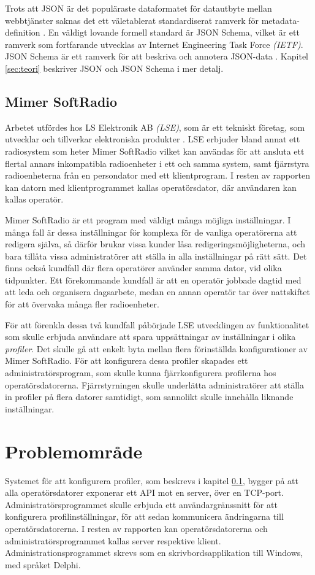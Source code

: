 Trots att JSON är det populäraste dataformatet för datautbyte mellan webbtjänster saknas det ett väletablerat standardiserat ramverk för metadata-definition \cite{Pezoa2016}. En väldigt lovande formell standard är JSON Schema, vilket är ett ramverk som fortfarande utvecklas av Internet Engineering Task Force \textit{(IETF)}. JSON Schema är ett ramverk för att beskriva och annotera JSON-data \cite{A.Wright}. Kapitel \ref{sec:teori} beskriver JSON och JSON Schema i mer detalj.

\subsection{Mimer SoftRadio}
\label{sec:intro:mimer}
Arbetet utfördes hos LS Elektronik AB \textit{(LSE)}, som är ett tekniskt företag, som utvecklar och tillverkar elektroniska produkter \cite{Ehne}. LSE erbjuder bland annat ett radiosystem som heter Mimer SoftRadio vilket kan användas för att ansluta ett flertal annars inkompatibla radioenheter i ett och samma system, samt fjärrstyra radioenheterna från en persondator med ett klientprogram. I resten av rapporten kan datorn med klientprogrammet kallas operatörsdator, där användaren kan kallas operatör.

Mimer SoftRadio är ett program med väldigt många möjliga inställningar. I många fall är dessa inställningar för komplexa för de vanliga operatörerna att redigera själva, så därför brukar vissa kunder låsa redigeringsmöjligheterna, och bara tillåta vissa administratörer att ställa in alla inställningar på rätt sätt. Det finns också kundfall där flera operatörer använder samma dator, vid olika tidpunkter. Ett förekommande kundfall är att en operatör jobbade dagtid med att leda och organisera dagsarbete, medan en annan operatör tar över nattskiftet för att övervaka många fler radioenheter.

För att förenkla dessa två kundfall påbörjade LSE utvecklingen av funktionalitet som skulle erbjuda användare att spara uppsättningar av inställningar i olika \textit{profiler}. Det skulle gå att enkelt byta mellan flera förinställda konfigurationer av Mimer SoftRadio. För att konfigurera dessa profiler skapades ett administratörsprogram, som skulle kunna fjärrkonfigurera profilerna hos operatörsdatorerna. Fjärrstyrningen skulle underlätta administratörer att ställa in profiler på flera datorer samtidigt, som sannolikt skulle innehålla liknande inställningar.

\section{Problemområde}
\label{sec:intro:problemområde}
Systemet för att konfigurera profiler, som beskrevs i kapitel \ref{sec:intro:mimer}, bygger på att alla operatörsdatorer exponerar ett API mot en server, över en TCP-port. Administratörsprogrammet skulle erbjuda ett användargränssnitt för att konfigurera profilinställningar, för att sedan kommunicera ändringarna till operatörsdatorerna. I resten av rapporten kan operatörsdatorerna och administratörsprogrammet kallas server respektive klient. Administrationsprogrammet skrevs som en skrivbordsapplikation till Windows, med språket Delphi.

